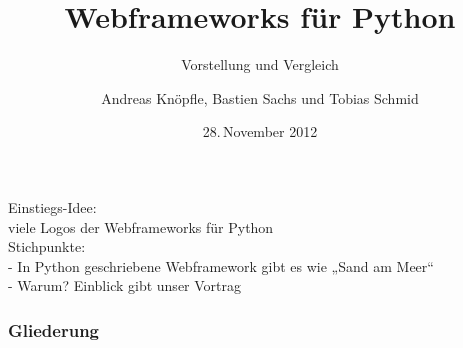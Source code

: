 \documentclass[
    t,
    smaller,
    compress,
]{beamer}
\title{Webframeworks für Python}
\subtitle{Vorstellung und Vergleich}
\author{Andreas Knöpfle, Bastien Sachs und Tobias Schmid}
\institute{Institut für Informatik}
\date{28.\,November 2012}
\begin{document}
{
\begin{frame} %
    \titlepage
\end{frame}
}


\begin{frame}
  Einstiegs-Idee:\\
  viele Logos der Webframeworks für Python\\
  Stichpunkte:\\
   - In Python geschriebene Webframework gibt es wie „Sand am Meer“\\
   - Warum? Einblick gibt unser Vortrag\\
\end{frame}


\begin{frame}
  \frametitle{Gliederung}
  \tableofcontents
\end{frame}
\end{document}

